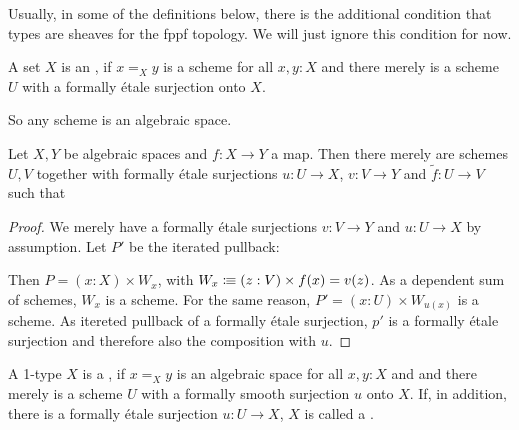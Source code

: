 Usually, in some of the definitions below,
there is the additional condition that types are sheaves for the fppf topology.
We will just ignore this condition for now.

\begin{definition}
  A set $X$ is an ,
  if $x=_Xy$ is a scheme for all $x,y:X$ and
  there merely is a scheme $U$ with a formally étale surjection onto $X$.
\end{definition}

So any scheme is an algebraic space.

\begin{lemma}
  Let $X,Y$ be algebraic spaces and $f:X\to Y$ a map.
  Then there merely are schemes $U,V$ together with formally étale surjections
  $u:U\to X$, $v:V\to Y$ and $\widetilde{f}:U\to V$ such that
  \begin{center}
  \end{center}
\end{lemma}

\begin{proof}
  We merely have a formally étale surjections $v:V\to Y$ and $u:U\to X$ by assumption.
  Let $P'$ be the iterated pullback:
  \begin{center}
  \end{center}
  Then $P=(x:X)\times W_x$, with $W_x\vcentcolon\mspace{-1.2mu}\equiv (z:V)\times f(x)=v(z)$.
  As a dependent sum of schemes, $W_x$ is a scheme.
  For the same reason, $P'=(x:U)\times W_{u(x)}$ is a scheme.
  As itereted pullback of a formally étale surjection,
  $p'$ is a formally étale surjection and
  therefore also the composition with $u$.
\end{proof}

\begin{definition}
  A 1-type $X$ is a ,
  if $x=_Xy$ is an algebraic space for all $x,y:X$ and
  and there merely is a scheme $U$ with a formally smooth surjection $u$ onto $X$.
  If, in addition, there is a
  formally étale surjection $u:U\to X$,
  $X$ is called a .
\end{definition}

